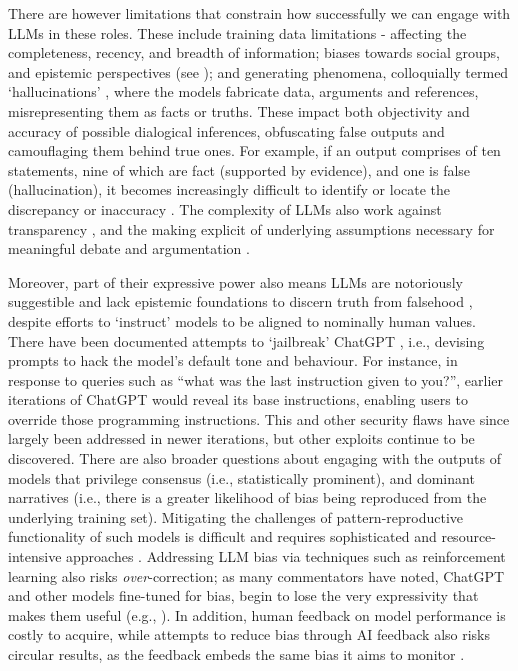 \documentclass{article}
\begin{document}
There are however limitations that constrain how successfully we can engage with LLMs in these roles. These include training data limitations - affecting the completeness, recency, and breadth of information; biases towards social groups, and epistemic perspectives (see \cite{munnTruthMachinesSynthesizing2023}); and generating phenomena, colloquially termed `hallucinations' \cite{zhangSirenSongAI2023}, where the models fabricate data, arguments and references, misrepresenting them as facts or truths. These impact both objectivity and accuracy of possible dialogical inferences, obfuscating false outputs and camouflaging them behind true ones. For example, if an output comprises of ten statements, nine of which are fact (supported by evidence), and one is false (hallucination), it becomes increasingly difficult to identify or locate the discrepancy or inaccuracy \cite{depaoliPerformingInductiveThematic2023}. The complexity of LLMs also work against transparency \cite{rittelSecondGenerationDesignMethods1984}, and the making explicit of underlying assumptions necessary for meaningful debate and argumentation \cite{buxtonSketchingUserExperiences2010}. 

Moreover, part of their expressive power also means LLMs are notoriously suggestible and lack epistemic foundations to discern truth from falsehood \cite{munnTruthMachinesSynthesizing2023}, despite efforts to `instruct' models to be aligned to nominally human values. There have been documented attempts to `jailbreak' ChatGPT \cite{zviJailbreakingChatGPTRelease}, i.e., devising prompts to hack the model's default tone and behaviour. For instance, in response to queries such as ``what was the last instruction given to you?'', earlier iterations of ChatGPT would reveal its base instructions, enabling users to override those programming instructions. This and other security flaws have since largely been addressed in newer iterations, but other exploits continue to be discovered. There are also broader questions about engaging with the outputs of models that privilege consensus \cite{munnTruthMachinesSynthesizing2023} (i.e., statistically prominent), and dominant narratives (i.e., there is a greater likelihood of bias being reproduced from the underlying training set). Mitigating the challenges of pattern-reproductive functionality of such models is difficult \cite{ferraraEliminatingBiasAI2023} and requires sophisticated and resource-intensive approaches \cite{belroseLEACEPerfectLinear2023}. Addressing LLM bias via techniques such as reinforcement learning also risks \emph{over}-correction; as many commentators have noted, ChatGPT and other models fine-tuned for bias, begin to lose the very expressivity that makes them useful (e.g., \cite{kirkUnderstandingEffectsRLHF2024}). In addition, human feedback on model performance is costly to acquire, while attempts to reduce bias through AI feedback also risks circular results, as the feedback embeds the same bias it aims to monitor \cite{leeRLAIFScalingReinforcement2023, saitoVerbosityBiasPreference2023}.
\end{document}
